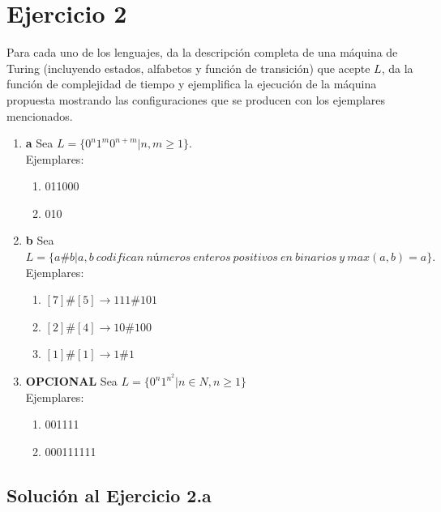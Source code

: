 \section{Ejercicio 2}


\begin{tcolorbox}[enunciado]
Para cada uno de los lenguajes, da la descripción completa de una máquina de Turing (incluyendo estados, alfabetos y función de transición) que acepte $L$, da la función de complejidad de tiempo y ejemplifica la ejecución de la máquina propuesta mostrando las configuraciones que se producen con los ejemplares mencionados.
\begin{enumerate}
\item \textbf{a} Sea $L=\{ 0^n1^m0^{n+m} | n,m\geq1 \}.$\\ Ejemplares: 
\begin{enumerate}
    \item 011000
    \item 010
\end{enumerate}
\item \textbf{b} Sea $L = \{ a\# b |a,b \ codifican \ números\  enteros\  positivos\  en\  binarios \ y\  max(a,b)=a \}.$\\
Ejemplares:
\begin{enumerate}
    \item $[7]\# [5] \rightarrow 111\#101$
    \item $[2] \# [4] \rightarrow10\#100$
    \item $[1]\#[1]\rightarrow 1\#1$
\end{enumerate}
\item \textbf{OPCIONAL} Sea $L= \{ 0^n1^{n^2} |n\in N, n \geq 1\}$\\
Ejemplares:
\begin{enumerate}
    \item 001111
    \item 000111111
\end{enumerate}
\end{enumerate}
\end{tcolorbox}

\subsection{Solución al Ejercicio 2.a}

